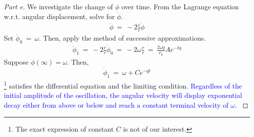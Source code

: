 \documentclass{article}
\numberwithin{equation}{section}
\begin{document}
\begin{proof}[Part e]
    We investigate the change of $\phi$ over time. From the 
    Lagrange equation w.r.t. angular displacement, solve for $\ddot \phi$. 
    \begin{align}
        \ddot \phi \ = \ - 2 \frac {\dot r} r \dot \phi 
    \end{align}
    Set $\dot \phi_0 \ = \ \omega$. Then, apply the method of successive 
    approximations. 
    \begin{align}
        \ddot \phi_1 \ = \ - 2 \frac {\dot r} r \dot \phi_0 \ = \ - 2 \omega \frac {\dot r} r \ = \ \frac {2 \omega q} {r_0} A e^{-tq}
    \end{align}
    Suppose $\phi(\infty) = \omega$. Then, 
    \begin{align}
        \dot \phi_1 \ = \ \omega + C e^{-qt}
    \end{align}\footnote{The exact expression of constant $C$ is not of our interest. }
    satisfies the differential equation and the limiting condition. 
    \textcolor{blue}{
        Regardless of the initial amplitude of the oscillation, the angular velocity will display exponential 
        decay either from above or below and reach a constant terminal velocity of $\omega$. 
    }
\end{proof}
\end{document}
